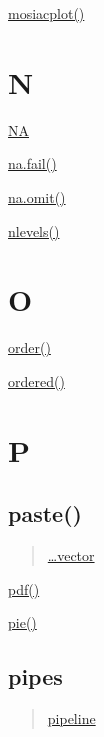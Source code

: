 \documentclass[]{book}
\begin{document}
\href{https://linkedin-learning.pxf.io/rweekly_mosaicplot}{mosiacplot()}

\hypertarget{n}{%
\chapter*{N}\label{n}}

\href{https://linkedin-learning.pxf.io/rweekly_na}{NA}

\href{https://linkedin-learning.pxf.io/rweekly_na}{na.fail()}

\href{https://linkedin-learning.pxf.io/rweekly_na}{na.omit()}

\href{https://linkedin-learning.pxf.io/rweekly_factor}{nlevels()}

\hypertarget{o}{%
\chapter*{O}\label{o}}

\href{https://linkedin-learning.pxf.io/rweekly_sortmerge}{order()}

\href{https://linkedin-learning.pxf.io/rweekly_factor}{ordered()}

\hypertarget{p}{%
\chapter*{P}\label{p}}

\hypertarget{paste}{%
\section*{paste()}\label{paste}}

\begin{quote}
\href{https://linkedin-learning.pxf.io/rwkly_vector}{\ldots{}vector}
\end{quote}

\href{linkedin-learning.pxf.io/rweekly_plottofile}{pdf()}

\href{linkedin-learning.pxf.io/rweekly_piechart}{pie()}

\hypertarget{pipes}{%
\section{pipes}\label{pipes}}

\begin{quote}
\href{https://linkedin-learning.pxf.io/rweekly_pipeline}{pipeline}
\end{quote}
\end{document}
